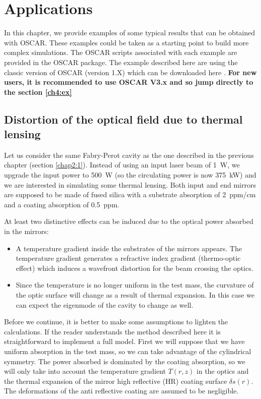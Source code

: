 \chapter{Applications}

In this chapter, we provide examples of some typical results that can be obtained with OSCAR. These examples could be taken as a starting point to build more complex simulations. The OSCAR scripts associated with each example are provided in the OSCAR package. The example described here are using the classic version of OSCAR (version 1.X) which can be downloaded here \cite{OS_down}.\textbf{ For new users, it is recommended to use OSCAR V3.x and so jump directly to the section \ref{ch4:ex}}

\section{Distortion of the optical field due to thermal lensing}\label{cha3.1}

Let us consider the same Fabry-Perot cavity as the one described in the previous chapter (section \ref{chap2:1}). Instead of using an input laser beam of 1~W, we upgrade the input power to 500~W (so the circulating power is now 375~kW) and we are interested in simulating some thermal lensing. Both input and end mirrors are supposed to be made of fused silica with a substrate absorption of 2~ppm/cm and a coating absorption of 0.5~ppm.

At least two distinctive effects can be induced due to the optical power absorbed in the mirrors:
\begin{itemize}
  \item A temperature gradient inside the substrates of the mirrors appears. The temperature gradient generates a refractive index gradient (thermo-optic effect) which induces a wavefront distortion for the beam crossing the optics.
  \item Since the temperature is no longer uniform in the test mass, the curvature of the optic surface will change as a result of thermal expansion. In this case we can expect the eigenmode of the cavity to change as well.
\end{itemize}

Before we continue, it is better to make some assumptions to lighten the calculations. If the reader understands the method described here it is straightforward to implement a full model. First we will suppose that we have uniform absorption in the test mass, so we can take advantage of the cylindrical symmetry. The power absorbed is dominated by the coating absorption, so we will only take into account the temperature gradient $T(r,z)$ in the optics and the thermal expansion of the mirror high reflective (HR) coating surface $\delta s(r)$. The deformations of the anti reflective coating are assumed to be negligible.

